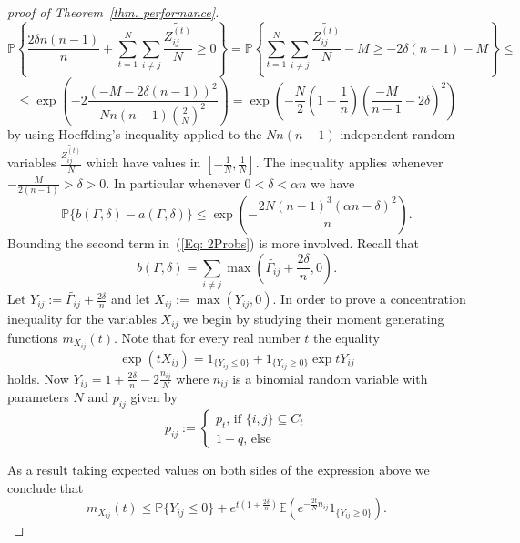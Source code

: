 \documentclass[12pt]{amsart}
\theoremstyle{remark}
\newcommand{\PP}{\mathbb{P}}
\newcommand{\EE}{\mathbb{E}}
\begin{document}
\begin{proof} [proof of Theorem~\ref{thm. performance}]
\[\PP\left\{\frac{2\delta n(n-1)}{n} + \sum_{t=1}^N \sum_{i\neq j} \frac{\widetilde{Z^{(t)}_{ij}}}{N}\geq 0\right\} = \PP\left\{\sum_{t=1}^N \sum_{i\neq j} \frac{\widetilde{Z^{(t)}_{ij}}}{N} - M \geq -2\delta (n-1) - M \right\}\leq\]
\[\leq \exp\left(-2\frac{(-M-2\delta(n-1))^2}{Nn(n-1)(\frac{2}{N})^2}\right)=\exp\left( -\frac{N}{2}\left(1-\frac{1}{n}\right) \left(\frac{-M}{n-1}-2\delta\right)^2\right) \]
by using Hoeffding's inequality applied to the $Nn(n-1)$ independent random variables $\frac{\widetilde{Z_{ij}^{(t)}}}{N}$ which have values in $\left[-\frac{1}{N},\frac{1}{N}\right]$. The inequality applies whenever $-\frac{M}{2(n-1)}>\delta>0$. In particular whenever $0<\delta<\alpha n$ we have
\[\PP\{b(\Gamma,\delta)-a(\Gamma,\delta)\}\leq \exp\left(-\frac{2N(n-1)^3(\alpha n-\delta)^2}{n}\right).\]
Bounding the second term in~(\ref{Eq: 2Probs}) is more involved. Recall that
\[b(\Gamma,\delta)=\sum_{i\neq j} \max\left(\widetilde{\Gamma_{ij}}+\frac{2\delta}{n},0\right).\]
Let $Y_{ij}:=\widetilde{\Gamma_{ij}}+\frac{2\delta}{n}$ and let $X_{ij}:=\max\left(Y_{ij},0\right)$. In order to prove a concentration inequality for the variables $X_{ij}$ we begin by studying their moment generating functions $m_{X_{ij}}(t)$. Note that for every real number $t$ the equality
\[\exp(tX_{ij})= 1_{\{Y_{ij}\leq 0\}} + 1_{\{Y_{ij}\geq 0\}} \exp tY_{ij}\]
holds. Now $Y_{ij}=1+\frac{2\delta}{n}-2\frac{n_{ij}}{N}$ where $n_{ij}$ is a binomial random variable with parameters $N$ and $p_{ij}$ given by
\[
p_{ij}:=\begin{cases}
p_t\text{, if $\{i,j\}\subseteq C_t$}\\
1-q\text{, else}
\end{cases}
\]


As a result taking expected values on both sides of the expression above we conclude that
\[ m_{X_{ij}}(t) \leq \PP\{Y_{ij}\leq 0\} + e^{t\left(1+\frac{2\delta}{n}\right)}\EE\left(e^{-\frac{2t}{N}n_{ij}}1_{\{Y_{ij}\geq 0\}}\right).\]


\end{proof}
\end{document}
